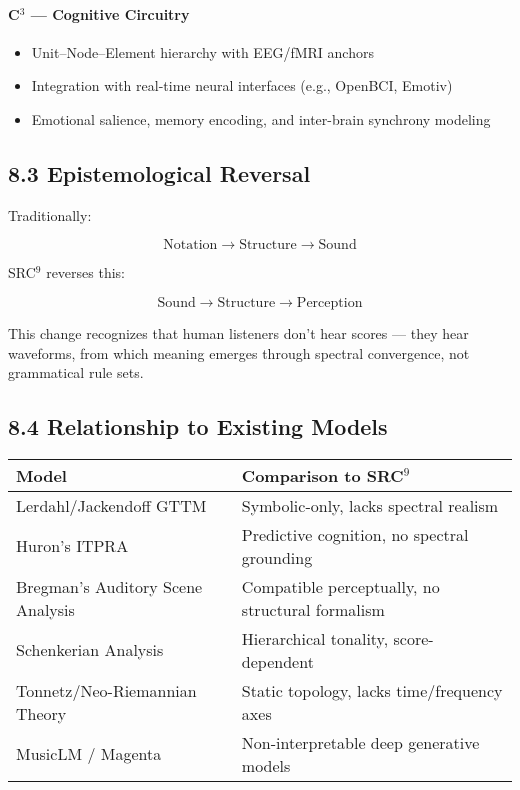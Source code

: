 \paragraph{C$^3$ — Cognitive Circuitry}
\begin{itemize}
    \item Unit–Node–Element hierarchy with EEG/fMRI anchors
    \item Integration with real-time neural interfaces (e.g., OpenBCI, Emotiv)
    \item Emotional salience, memory encoding, and inter-brain synchrony modeling
\end{itemize}

\subsection*{8.3 Epistemological Reversal}

Traditionally:

\[
\text{Notation} \rightarrow \text{Structure} \rightarrow \text{Sound}
\]

SRC$^{9}$ reverses this:

\[
\text{Sound} \rightarrow \text{Structure} \rightarrow \text{Perception}
\]

This change recognizes that human listeners don’t hear scores — they hear waveforms, from which meaning emerges through spectral convergence, not grammatical rule sets.

\subsection*{8.4 Relationship to Existing Models}

\begin{center}
\begin{tabular}{|l|p{8cm}|}
\hline
\textbf{Model} & \textbf{Comparison to SRC$^9$} \\
\hline
Lerdahl/Jackendoff GTTM & Symbolic-only, lacks spectral realism \\
Huron’s ITPRA & Predictive cognition, no spectral grounding \\
Bregman’s Auditory Scene Analysis & Compatible perceptually, no structural formalism \\
Schenkerian Analysis & Hierarchical tonality, score-dependent \\
Tonnetz/Neo-Riemannian Theory & Static topology, lacks time/frequency axes \\
MusicLM / Magenta & Non-interpretable deep generative models \\
\hline
\end{tabular}
\end{center}

